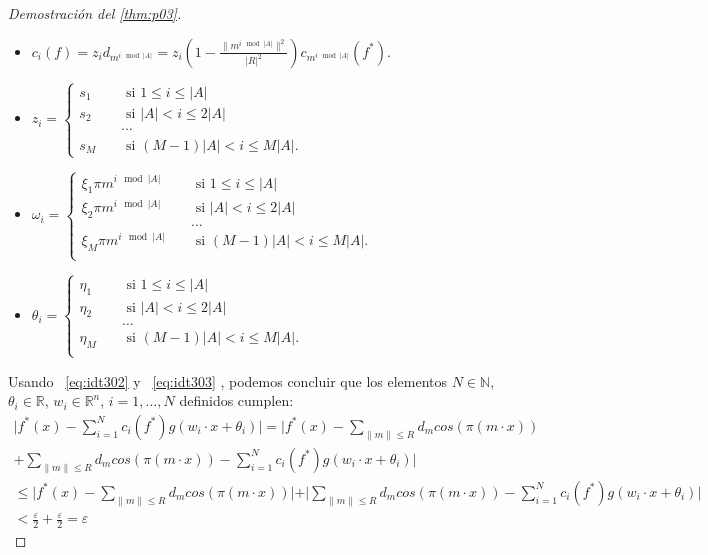 \begin{proof}[Demostración del \autoref{thm:p03}]
\begin{itemize}

\item $c_{i}(f)= z_{i}d_{m^{i \mod{\vert A \vert}}}= z_{i} (1-\frac{\| m^{i \mod{\vert A \vert}}\|^{2}}{\vert R\vert^{2}})c_{m^{i \mod{\vert A \vert}}}(f^{*})$.
\item $
		z_{i}  = \begin{cases} s_{1} \quad & \text{ si }  1 \leq i \leq  \vert A \vert \\
		s_{2} \quad & \text{ si }  \vert A \vert < i \leq 2 \vert A \vert \\
		       & \cdots \\
		s_{M} \quad & \text{ si }  (M-1) \vert A \vert < i \leq M \vert A \vert.
		\end{cases} $

\item $\omega_{i} = \begin{cases}
		\xi_{1}\pi m^{i \mod{ \vert A \vert}} \quad & \text{ si }  1 \leq i \leq \vert A \vert \\
		\xi_{2}\pi m^{i \mod{ \vert A \vert}} \quad & \text{ si }   \vert A \vert < i \leq 2 \vert A \vert \\
		       & \dots \\
		\xi_{M}\pi m^{i \mod{ \vert A \vert}} \quad & \text{ si }  (M-1) \vert A \vert < i \leq M \vert A \vert. \\		\end{cases}  $

\item $\theta_{i} = \begin{cases}
		\eta_{1} \quad & \text{ si }  1 \leq i \leq  \vert A \vert \\
		\eta_{2} \quad & \text{ si }  \vert A \vert < i \leq 2 \vert A \vert \\
		       & \dots \\
		\eta_{M} \quad & \text{ si }  (M-1) \vert A \vert < i \leq M \vert A \vert. \\		\end{cases}  		$
\end{itemize}
 Usando  ~\eqref{eq:idt302} y ~\eqref{eq:idt303} , podemos concluir que los elementos $N\in\mathds{N}$, $\theta_{i}\in \mathds{R}$, $w_{i}\in \mathds{R}^{n}$, $i=1,\dots,N$ definidos cumplen:
\begin{gather}
\vert f^{*}(x)-\sum_{i=1}^{N}c_{i}(f^{*})g(w_{i}\cdot x+\theta_{i})\vert = 
 \vert f^{*}(x)- \sum_{\| m\| \leq R}d_{m}cos(\pi(m\cdot x)) 
\\
 +\sum_{\| m\| \leq R}d_{m}cos(\pi(m\cdot x)) -\sum_{i=1}^{N}c_{i}(f^{*})g(w_{i}\cdot x+\theta_{i})\vert  \\ \leq
\vert f^{*}(x)- \sum_{\| m\| \leq R}d_{m}cos(\pi(m\cdot x)) \vert +
\vert \sum_{\| m\| \leq R}d_{m}cos(\pi(m\cdot x)) -
\sum_{i=1}^{N}c_{i}(f^{*})g(w_{i}\cdot x+\theta_{i}) \vert  \\ < \frac{\varepsilon}{2} + \frac{\varepsilon}{2} = \varepsilon
\end{gather}


\end{proof}
